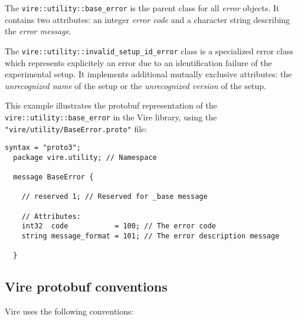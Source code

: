 The \texttt{vire::utility::base\_error}  is the  parent class  for all
\emph{error}  objects.   It  contains   two  attributes:   an  integer
\emph{error code}  and a  character string describing  the \emph{error
  message}.

The   \texttt{vire::utility::invalid\_setup\_id\_error}  class   is  a
specialized error class  which represents explicitely an  error due to
an identification  failure of  the experimental setup.   It implements
additional mutually exclusive attributes: the \emph{unrecognized name}
of the setup or the \emph{unrecognized version} of the setup.

This   example  illustrates   the  protobuf   representation  of   the
\texttt{vire::utility::base\_error}  in the  Vire  library, using  the
\texttt{"vire/utility/BaseError.proto"} file:

\small
\begin{Verbatim}[frame=single,xleftmargin=0.cm,label=\fbox{protobuf}]
  syntax = "proto3";
  package vire.utility; // Namespace

  message BaseError {

    // reserved 1; // Reserved for _base message

    // Attributes:
    int32  code           = 100; // The error code
    string message_format = 101; // The error description message

  }
\end{Verbatim}
\normalsize

\vfill
\clearpage
\pagebreak

\subsection{Vire protobuf conventions}

Vire uses the following conventions:

